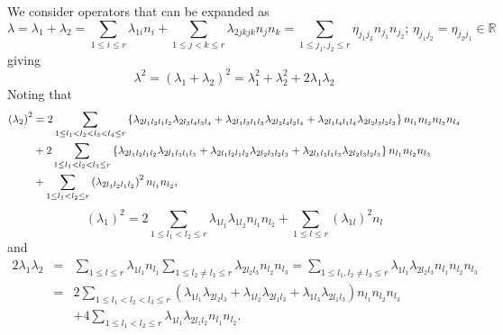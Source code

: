 \documentclass[12pt]{article}
\begin{document}
We consider operators that can be expanded as 
\begin{equation}
\lambda =\lambda _{1}+\lambda _{2}=\sum_{1\leq i\leq r}\lambda
_{1i}n_{i}+\sum_{1\leq j<k\leq r}\lambda _{2jkjk}n_{j}n_{k}=\sum_{1\leq
j_{1},j_{2}\leq r}\eta _{j_{1}j_{2}}n_{j_{1}}n_{j_{2}};\,\eta
_{j_{1}j_{2}}=\eta _{j_{2}j_{1}}\in \mathbb{R}
\end{equation}%
giving 
\begin{equation}
\lambda ^{2}=\left( \lambda _{1}+\lambda _{2}\right) ^{2}=\lambda
_{1}^{2}+\lambda _{2}^{2}+2\lambda _{1}\lambda _{2}
\end{equation}%
Noting that 
\begin{align}
\left( \lambda _{2}\right) ^{2}& =2\sum_{\substack{ 1\leq
l_{1}<l_{2}<l_{3}<l_{4}\leq r}}\left\{ \lambda
_{2l_{1}l_{2}l_{1}l_{2}}\lambda _{2l_{3}l_{4}l_{3}l_{4}}+\lambda
_{2l_{1}l_{3}l_{1}l_{3}}\lambda _{2l_{2}l_{4}l_{2}l_{4}}+\lambda
_{2l_{1}l_{4}l_{1}l_{4}}\lambda _{2l_{2}l_{3}l_{2}l_{3}}\right\}
n_{l_{1}}n_{l_{2}}n_{l_{3}}n_{l_{4}}  \notag \\
& +2\sum_{\substack{ 1\leq l_{1}<l_{2}<l_{3}\leq r}}\left\{ \lambda
_{2l_{1}l_{2}l_{1}l_{2}}\lambda _{2l_{1}l_{3}l_{1}l_{3}}+\lambda
_{2l_{1}l_{2}l_{1}l_{2}}\lambda _{2l_{2}l_{3}l_{2}l_{3}}+\lambda
_{2l_{1}l_{3}l_{1}l_{3}}\lambda _{2l_{2}l_{3}l_{2}l_{3}}\right\}
n_{l_{1}}n_{l_{2}}n_{l_{3}}  \notag \\
& +\sum_{\substack{ 1\leq l_{1}<l_{2}\leq r}}\left( \lambda
_{2l_{1}l_{2}l_{1}l_{2}}\right) ^{2}n_{l_{1}}n_{l_{2}},  \notag
\end{align}%
\begin{equation}
\left( \lambda _{1}\right) ^{2}=2\sum_{1\leq l_{1}<l_{2}\leq r}\lambda
_{1l_{1}}\lambda _{1l_{2}}n_{l_{1}}n_{l_{2}}+\sum_{1\leq l\leq r}\left(
\lambda _{1l}\right) ^{2}n_{l}
\end{equation}%
and 
\begin{eqnarray}
2\lambda _{1}\lambda _{2} &=&\sum_{1\leq l\leq r}\lambda
_{1l_{1}}n_{l_{1}}\sum_{1\leq l_{2}\neq l_{3}\leq r}\lambda
_{2l_{2}l_{3}}n_{l_{2}}n_{l_{3}}=\sum_{1\leq l_{1},l_{2}\neq l_{3}\leq
r}\lambda _{1l_{1}}\lambda _{2l_{2}l_{3}}n_{l_{1}}n_{l_{2}}n_{l_{3}} \\
&=&2\sum_{1\leq l_{1}<l_{2}<l_{3}\leq r}\left( \lambda _{1l_{1}}\lambda
_{2l_{2}l_{3}}+\lambda _{1l_{2}}\lambda _{2l_{1}l_{3}}+\lambda
_{1l_{3}}\lambda _{2l_{1}l_{3}}\right) n_{l_{1}}n_{l_{2}}n_{l_{3}} \\
&&+4\sum_{1\leq l_{1}<l_{2}\leq r}\lambda _{1l_{1}}\lambda
_{2l_{1}l_{2}}n_{l_{1}}n_{l_{2}}.
\end{eqnarray}%
\end{document}

